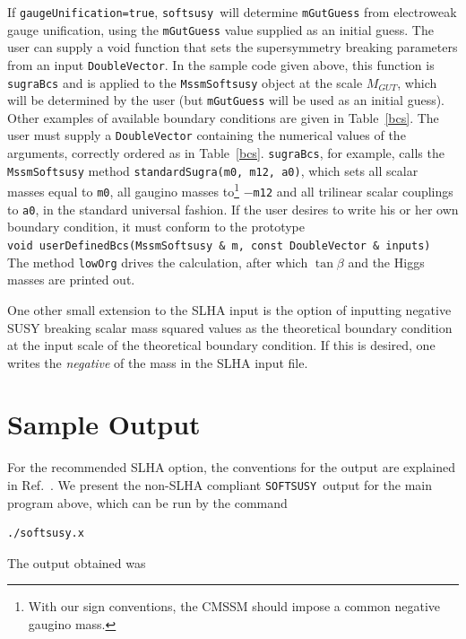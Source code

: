 \documentclass{article}
\def\SOFTSUSY{{\tt SOFTSUSY}}
\def\code#1{\small{\tt #1}\normalsize}
\begin{document}
If \code{gaugeUnification=true}, \code{softsusy}~will determine
\code{mGutGuess} from electroweak gauge unification, using
the \code{mGutGuess} value supplied as an initial guess. 
The user can supply a void function that sets the supersymmetry breaking
parameters from an input \code{DoubleVector}. In the sample code given above,
this function is
\code{sugraBcs} and is applied to the \code{MssmSoftsusy} object at the
scale $M_{GUT}$, which will be determined by the user (but \code{mGutGuess}
will be
used as an initial guess). 
Other examples of available boundary conditions are given in
Table~\ref{bcs}. 
The user must supply a \code{DoubleVector} containing the
numerical values of the arguments, correctly ordered as in
Table~\ref{bcs}.
\code{sugraBcs}, for example, calls the \code{MssmSoftsusy} method
\code{standardSugra(m0, m12, a0)}, which sets all scalar masses equal to
\code{m0}, 
all gaugino masses to\footnote{With our sign conventions, the CMSSM should
  impose a common negative gaugino mass.} $-$\code{m12} and all trilinear
scalar couplings to 
\code{a0}, in the standard universal fashion. 
If the user desires to write his or her own boundary condition, it must
conform to the prototype\\
\code{void userDefinedBcs(MssmSoftsusy \& m, const DoubleVector \& inputs)}\\
The method \code{lowOrg} drives the calculation, after which $\tan \beta$ and
the Higgs masses are
printed out.

One other small extension to the SLHA input is the option of inputting
negative SUSY breaking scalar mass squared values as the theoretical boundary
condition at the input scale of the theoretical boundary condition. If this is
desired, one writes the {\em negative} of the mass in the SLHA input file.

\section{Sample Output \label{sec:output}}
For the recommended SLHA option, the conventions for the output are 
explained in Ref.~\cite{lhacc}. 
We present the non-SLHA compliant \SOFTSUSY~output 
for the main program above, which can be run by the command
\small\begin{verbatim} 
./softsusy.x
\end{verbatim}\normalsize
The output obtained was
\small\normalsize
\end{document}
